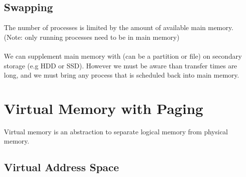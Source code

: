 \documentclass{report}
\begin{document}
        \subsection*{Swapping}
            The number of processes is limited by the amount of available main memory. (Note: only running processes need to be in main memory)
            \\ 
            \\ We can supplement main memory with  (can be a partition or file) on secondary storage (e.g HDD or SSD). However we must be aware than transfer times are long, 
            and we must bring any process that is scheduled back into main memory.
    
    \section*{Virtual Memory with Paging}
        Virtual memory is an abstraction to separate logical memory from physical memory.
        \subsection*{Virtual Address Space}
        
\end{document}
